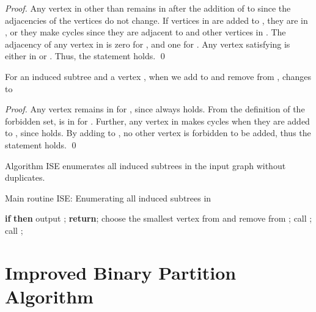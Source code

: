 \documentclass{llncs}
\newcommand{\MyProc}[1]{{\rm \textsc{#1}}}
\begin{document}
\begin{proof}
    Any vertex in  other than  
    remains in  after the addition of  to  
    since the adjacencies of the vertices do not change. 
    If vertices in  are added to , 
    they are in , or they make cycles 
    since they are adjacent to  and other vertices in .  
    The adjacency of any vertex in  is zero for , 
    and one for . 
Any vertex  satisfying  
    is either in  or . 
    Thus, the statement holds. 
    \qed
\end{proof}


\begin{lemma}
    \label{lem:X:update}
    For an induced subtree  and a vertex , 
    when we add  to  and remove  from , 
     changes to 
    
\end{lemma}

\begin{proof}
    Any vertex  remains in  for , 
    since  always holds. 
    From the definition of the forbidden set, 
     is in  for . 
    Further, 
    any vertex  in  makes cycles when they are added to , 
    since  holds. 
By adding  to , 
    no other vertex is forbidden to be added, 
    thus the statement holds. 
    \qed
\end{proof}


\begin{theorem}
    \label{thm:correctness}
    Algorithm \MyProc{ISE} enumerates all induced subtrees 
    in the input graph  without duplicates. 
\end{theorem}



\begin{algorithm}[t]
    \caption{Main routine \MyProc{ISE}: Enumerating all induced subtrees in }
    \label{alg:ISE}
    \begin{algorithmic}[1]
        \State \textbf{if}  
               \textbf{then} output ; 
               \textbf{return};  
        \label{alg:ISE:output}
        \State choose the smallest vertex  from  and remove  from ; 
        \label{alg:ISE:choose}
        \State call ; 
        \label{alg:ISE:call1}
        \State call ; 
        \label{alg:ISE:call2}
        \EndProcedure
    \end{algorithmic}
\end{algorithm}





\section{Improved Binary Partition Algorithm}
\label{sec:time:complexity} 
\end{document}
